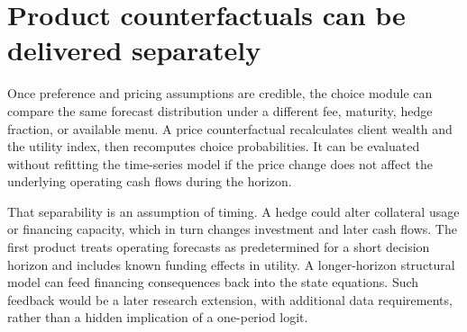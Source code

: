 \section{Product counterfactuals can be delivered separately}
Once preference and pricing assumptions are credible, the choice module can compare the same forecast distribution under a different fee, maturity, hedge fraction, or available menu. A price counterfactual recalculates client wealth and the utility index, then recomputes choice probabilities. It can be evaluated without refitting the time-series model if the price change does not affect the underlying operating cash flows during the horizon.

That separability is an assumption of timing. A hedge could alter collateral usage or financing capacity, which in turn changes investment and later cash flows. The first product treats operating forecasts as predetermined for a short decision horizon and includes known funding effects in utility. A longer-horizon structural model can feed financing consequences back into the state equations. Such feedback would be a later research extension, with additional data requirements, rather than a hidden implication of a one-period logit.
